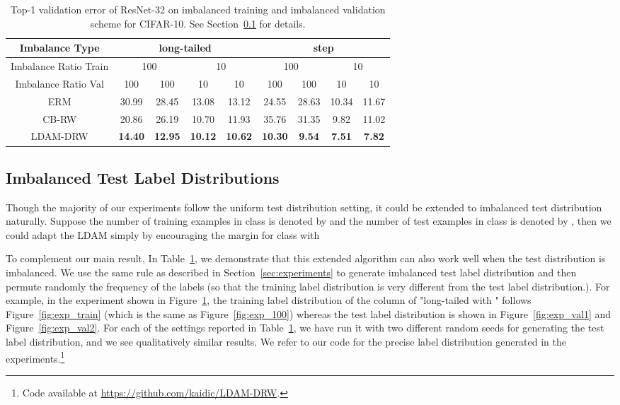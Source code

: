 \documentclass{article}
\newcommand{\ldam}{\textup{LDAM}}
\begin{document}
\begin{table}[htbp]
\caption{Top-1 validation error of ResNet-32 on imbalanced training and imbalanced validation scheme for CIFAR-10. See Section~\ref{sec:imbalanced_test} for details.}
\label{tab:imbalanced_test}
\centering
\begin{tabular}{c|cc|cc|cc|cc}
\toprule
Imbalance Type  & \multicolumn{4}{c|}{long-tailed} & \multicolumn{4}{c}{step} \\ \midrule
Imbalance Ratio Train  & \multicolumn{2}{c|}{100}  & \multicolumn{2}{c|}{10}   & \multicolumn{2}{c|}{100} & \multicolumn{2}{c}{10}   \\ \midrule
Imbalance Ratio Val  & \multicolumn{1}{c|}{100}  & 100 & \multicolumn{1}{c|}{10}   & 10   & \multicolumn{1}{c|}{100}  & 100 & \multicolumn{1}{c|}{10}   & 10   \\ \midrule
ERM & 30.99 & 28.45 & 13.08 & 13.12 & 24.55 & 28.63 & 10.34 & 11.67 \\
CB-RW & 20.86 & 26.19 & 10.70 & 11.93 & 35.76 & 31.35 & 9.82 & 11.02      \\
LDAM-DRW &  \textbf{14.40} & \textbf{12.95} & \textbf{10.12} & \textbf{10.62} & \textbf{10.30} & \textbf{9.54} & \textbf{7.51} & \textbf{7.82}  \\\bottomrule
\end{tabular}
\end{table}

\subsection{Imbalanced Test Label Distributions}\label{sec:imbalanced_test}

Though the majority of our experiments follow the uniform test distribution setting, it could be extended to imbalanced test distribution naturally. Suppose the number of training examples in class  is denoted by  and the number of test examples in class  is denoted by , then we could adapt the \ldam{} simply by encouraging the margin  for class  with 


To complement our main result, In Table~\ref{tab:imbalanced_test}, we demonstrate that this extended algorithm can also work well when the test distribution is imbalanced. We use the same rule as described in Section~\ref{sec:experiments} to generate imbalanced test label distribution and then permute randomly the frequency of the labels (so that the training label distribution is very different from the test label distribution.). For example, in the experiment shown in Figure~\ref{tab:imbalanced_test}, the training label distribution of the column of "long-tailed with " follows Figure~\ref{fig:exp_train} (which is the same as Figure~\ref{fig:exp_100}) whereas the test label distribution is shown in Figure~\ref{fig:exp_val1} and Figure~\ref{fig:exp_val2}. For each of the settings reported in Table~\ref{tab:imbalanced_test}, we have run it with two different random seeds for generating the test label distribution, and we see qualitatively similar results. We refer to our code for the precise label distribution generated in the experiments.\footnote{Code available at \url{https://github.com/kaidic/LDAM-DRW}.}


 
\end{document}
